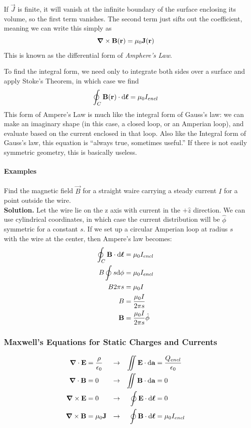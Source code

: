 \documentclass[a4paper]{article}
\begin{document}
If $\vec{J}$ is finite, it will vanish at the infinite boundary of the surface
enclosing its volume, so the first term vanishes. The second term just
sifts out the coefficient, meaning we can write this simply as
\[ \boldsymbol{\mathbf{\nabla}}\times\boldsymbol{\mathbf{B}}(\boldsymbol{\mathbf{r}}) = \mu_0\boldsymbol{\mathbf{J}}(\boldsymbol{\mathbf{r}}) \]
This is known as the differential form of \emph{Amphere's Law}.

To find the integral form, we need only to integrate both sides over a
surface and apply Stoke's Theorem, in which case we find
\[ \oint_C \boldsymbol{\mathbf{B}}(\boldsymbol{\mathbf{r}})\cdot\mathrm{d}\boldsymbol{\mathbf{\ell}} = \mu_0I_{encl} \]
This form of Ampere's Law is much like the integral form of Gauss's law: we can
make an imaginary shape (in this case, a closed loop, or an Amperian loop), and
evaluate based on the current enclosed in that loop. Also like the Integral
form of Gauss's law, this equation is ``always true, sometimes useful.'' If
there is not easily symmetric geometry, this is basically useless.

\paragraph{Examples}

\begin{eg}
	Find the magnetic field $\vec{B}$ for a straight waire carrying a steady
	current $I$ for a point outside the wire.\\
	\textbf{Solution.}
	Let the wire lie on the z axis with current in the $+\hat{z}$
	direction. We can use cylindrical coordinates, in which case the
	current distribution will be $\hat{\phi}$ symmetric for a constant
	$s$. If we set up a circular Amperian loop at radius $s$ with the
	wire at the center, then Ampere's law becomes:
	\begin{align*}
		\oint_C\boldsymbol{\mathbf{B}}\cdot\mathrm{d}\boldsymbol{\mathbf{\ell}} &= \mu_0I_{encl}\\
		B\oint s\mathrm{d}\phi &= \mu_0I_{encl}\\
		B2\pi s &= \mu_0 I\\
		B &= \frac{\mu_0 I}{2\pi s}\\
		\boldsymbol{\mathbf{B}} &= \frac{\mu_0 I}{2\pi s}\hat{\phi}
	\end{align*}
\end{eg}

\subsubsection{Maxwell's Equations for Static Charges and Currents}
\begin{align*}
	\boldsymbol{\mathbf{\nabla}}\cdot\boldsymbol{\mathbf{E}} &= \frac{\rho}{\epsilon_0} &\to&&
	\iint\boldsymbol{\mathbf{E}}\cdot\mathrm{d}\boldsymbol{\mathbf{a}} &= \frac{Q_{encl}}{\epsilon_0}\\
	\boldsymbol{\mathbf{\nabla}}\cdot\boldsymbol{\mathbf{B}} &= 0 &\to&&
	\iint\boldsymbol{\mathbf{B}}\cdot\mathrm{d}\boldsymbol{\mathbf{a}} &= 0\\
	\boldsymbol{\mathbf{\nabla}}\times\boldsymbol{\mathbf{E}} &= 0 &\to&&
	\oint\boldsymbol{\mathbf{E}}\cdot\mathrm{d}\boldsymbol{\mathbf{\ell}} &= 0\\
	\boldsymbol{\mathbf{\nabla}}\times\boldsymbol{\mathbf{B}} &= \mu_0\boldsymbol{\mathbf{J}} &\to&&
	\oint\boldsymbol{\mathbf{B}}\cdot\mathrm{d}\boldsymbol{\mathbf{\ell}} &= \mu_0 I_{encl}
\end{align*}
\end{document}
